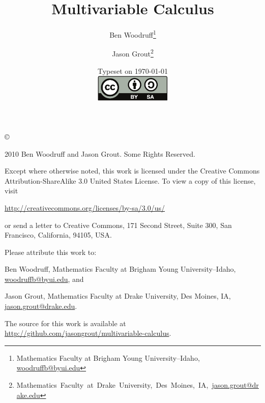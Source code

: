 \documentclass[letterpaper,oneside]{book}%
\theoremstyle{plain}
\theoremstyle{box}
\begin{document}

\frontmatter
\title{Multivariable Calculus}
\author{Ben Woodruff\thanks{Mathematics Faculty at Brigham Young
    University--Idaho, \url{woodruffb@byui.edu}} \and Jason
  Grout\thanks{\mbox{Mathematics Faculty at Drake University, Des Moines,
    IA, \url{jason.grout@drake.edu}}}}
\date{Typeset on \today\\
\vfill
\includegraphics[height=1.3cm]{by-sa}
\vfill}
\maketitle
\thispagestyle{empty}

\noindent\copyright{ 2010 Ben Woodruff and Jason Grout.  Some Rights Reserved.\\

\bigskip

\noindent Except where otherwise noted, this work is licensed under the Creative Commons
Attribution-ShareAlike 3.0 United States License. To view a copy of
this license, visit 
\begin{center}
  \url{http://creativecommons.org/licenses/by-sa/3.0/us/}
\end{center}
or send a letter to Creative Commons, 171 Second Street, Suite 300,
San Francisco, California, 94105, USA.

\bigskip

\noindent Please attribute this work to:
\smallskip

Ben Woodruff, Mathematics Faculty at Brigham Young University--Idaho,
 \url{woodruffb@byui.edu}, and

\smallskip

 Jason Grout, Mathematics Faculty at Drake University, Des Moines, IA,
 \url{jason.grout@drake.edu}.

\vfill 

The source for this work is available at \url{http://github.com/jasongrout/multivariable-calculus}.
\vfill
}
\restoregeometry
\tableofcontents



%
\end{document}
